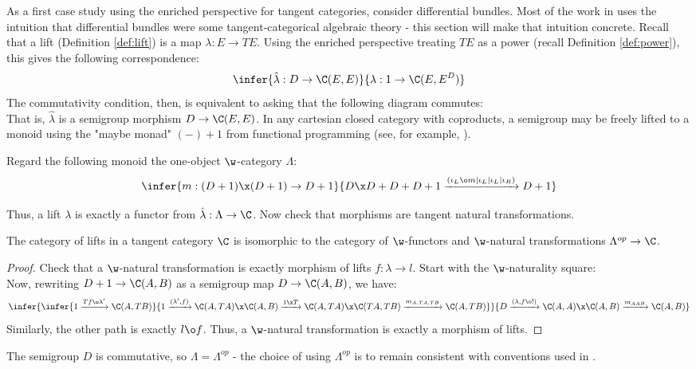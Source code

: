 As a first case study using the enriched perspective for tangent categories, consider differential bundles. Most of the work in  uses the intuition that differential bundles were some tangent-categorical algebraic theory - this section will make that intuition concrete. Recall that a lift (Definition \ref{def:lift}) is a map $\lambda:E \to TE$. Using the enriched perspective treating $TE$ as a power (recall Definition \ref{def:power}), this gives the following correspondence:
\[
	\infer{\hat{\lambda}:D \to \C(E,E)}{\lambda: 1 \to \C(E, E^D)}
\]
The commutativity condition, then, is equivalent to asking that the following diagram commutes:
\[\]
That is, $\hat{\lambda}$ is a semigroup morphism $D \to \C(E,E)$. In any cartesian closed category with coproducts, a semigroup may be freely lifted to a monoid using the "maybe monad" $(-) + 1$ from functional programming (see, for example, \cite{Seal2013}).
\begin{definition}%
	\label{def:lambda-monoid}
	Regard the following monoid the one-object $\w$-category $\Lambda$:
	\[
		\infer{m: (D+1) \x (D+1) \to D+1}{D \x D + D + D + 1 \xrightarrow{(\iota_L\o m | \iota_L | \iota_L |\iota_R)} D + 1}
	\]
\end{definition}
Thus, a lift $\lambda$ is exactly a functor from $\hat{\lambda}:\Lambda \to \C$. Now check that morphisms are tangent natural transformations.
\begin{lemma}%
	\label{lem:cat-of-lifts-iso}
	The category of lifts in a tangent category $\C$ is isomorphic to the category of $\w$-functors and $\w$-natural transformations $\Lambda^{op} \to \C$.
\end{lemma}
\begin{proof}
	Check that a $\w$-natural transformation is exactly morphism of lifts $f: \lambda \to l$. Start with the $\w$-naturality square:
	\[\]
	Now, rewriting $D+1 \to \C(A,B)$ as a semigroup map $D \to \C(A,B)$, we have:
	\[
		\infer{
			\infer{
				1 \xrightarrow{Tf \o \lambda'}\C(A,TB)
			}{
				1 \xrightarrow{(\lambda',f)} \C(A,TA) \x \C(A,B) \xrightarrow{1 \x T} \C(A,TA) \x \C(TA,TB) \xrightarrow{m_{A,TA,TB}} \C(A,TB)
			}}{
			D \xrightarrow{(\lambda,f\o !)} \C(A,A) \x \C(A,B) \xrightarrow{m_{AAB}} \C(A,B)
		}
	\]
	Similarly, the other path is exactly $l \o f$. Thus, a $\w$-natural transformation is exactly a morphism of lifts.
\end{proof}
\begin{observation}
	The semigroup $D$ is commutative, so $\Lambda = \Lambda^{op}$ - the choice of using $\Lambda^{op}$ is to remain consistent with conventions used in .
\end{observation}
